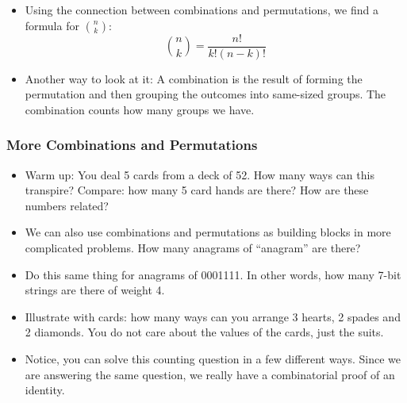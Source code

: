 \documentclass[12pt]{article}
\theoremstyle{plain}
\theoremstyle{definition}
\theoremstyle{remark}
\newcommand{\todayis}[1]{\clearpage{\rhead{\footnotesize #1}}}
\begin{document}
\begin{itemize}
 \item Using the connection between combinations and permutations, we find a formula for ${n \choose k}$:
 \[{n\choose k} = \frac{n!}{k!(n-k)!}\]


\item Another way to look at it: A combination is the result of forming the permutation and then grouping the outcomes into same-sized groups.  The combination counts how many groups we have.

%

 \end{itemize}


\todayis{Monday, September 11}

\subsubsection*{More Combinations and Permutations}

\begin{itemize}

  \item Warm up: You deal 5 cards from a deck of 52.  How many ways can this transpire?  Compare: how many 5 card hands are there?  How are these numbers related?

  \item We can also use combinations and permutations as building blocks in more complicated problems.  How many anagrams of ``anagram'' are there?

  \item Do this same thing for anagrams of 0001111.  In other words, how many 7-bit strings are there of weight 4.

  \item Illustrate with cards: how many ways can you arrange 3 hearts, 2 spades and 2 diamonds.  You do not care about the values of the cards, just the suits.

  \item Notice, you can solve this counting question in a few different ways.  Since we are answering the same question, we really have a combinatorial proof of an identity.
\end{itemize}
\end{document}
